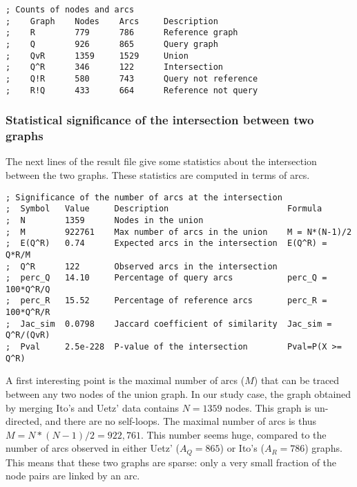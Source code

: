 \begin{enumerate}
\begin{footnotesize}
\begin{verbatim}
; Counts of nodes and arcs
;    Graph    Nodes    Arcs     Description
;    R        779      786      Reference graph
;    Q        926      865      Query graph
;    QvR      1359     1529     Union
;    Q^R      346      122      Intersection
;    Q!R      580      743      Query not reference
;    R!Q      433      664      Reference not query
\end{verbatim}
\end{footnotesize}

\subsubsection{Statistical significance of the intersection between two graphs}

The next lines of the result file give some statistics about the
intersection between the two graphs. These statistics are computed in
terms of arcs.

\begin{footnotesize}
\begin{verbatim}
; Significance of the number of arcs at the intersection
;  Symbol   Value     Description                        Formula
;  N        1359      Nodes in the union                    
;  M        922761    Max number of arcs in the union    M = N*(N-1)/2
;  E(Q^R)   0.74      Expected arcs in the intersection  E(Q^R) = Q*R/M
;  Q^R      122       Observed arcs in the intersection
;  perc_Q   14.10     Percentage of query arcs           perc_Q = 100*Q^R/Q
;  perc_R   15.52     Percentage of reference arcs       perc_R = 100*Q^R/R
;  Jac_sim  0.0798    Jaccard coefficient of similarity  Jac_sim = Q^R/(QvR)
;  Pval     2.5e-228  P-value of the intersection        Pval=P(X >= Q^R)
\end{verbatim}
\end{footnotesize}

A first interesting point is the maximal number of arcs ($M$) that can
be traced between any two nodes of the union graph. In our study case,
the graph obtained by merging Ito's and Uetz' data contains $N=1359$
nodes. This graph is un-directed, and there are no self-loops. The
maximal number of arcs is thus $M=N*(N-1)/2=922,761$. This number
seems huge, compared to the number of arcs observed in either Uetz'
($A_Q=865$) or Ito's ($A_R=786$) graphs. This means that these two
graphs are sparse: only a very small fraction of the node pairs are
linked by an arc.


\end{enumerate}
